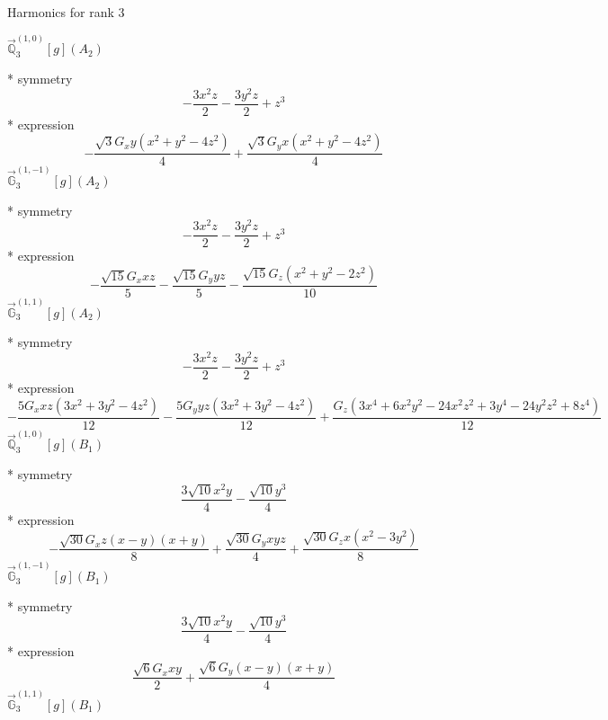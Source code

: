 \documentclass[fleqn,8pt]{jsarticle}
\begin{document}
\noindent * Harmonics for rank 3

\noindent\quad $\vec{\mathbb{Q}}_{3}^{(1,0)}[g](A_{2})$

\noindent\quad ** symmetry
\begin{dmath*}
- \frac{3 x^{2} z}{2} - \frac{3 y^{2} z}{2} + z^{3}
\end{dmath*}
\noindent\quad ** expression
\begin{dmath*}
- \frac{\sqrt{3} G_{x} y \left(x^{2} + y^{2} - 4 z^{2}\right)}{4} + \frac{\sqrt{3} G_{y} x \left(x^{2} + y^{2} - 4 z^{2}\right)}{4}
\end{dmath*}
\noindent\quad $\vec{\mathbb{G}}_{3}^{(1,-1)}[g](A_{2})$

\noindent\quad ** symmetry
\begin{dmath*}
- \frac{3 x^{2} z}{2} - \frac{3 y^{2} z}{2} + z^{3}
\end{dmath*}
\noindent\quad ** expression
\begin{dmath*}
- \frac{\sqrt{15} G_{x} x z}{5} - \frac{\sqrt{15} G_{y} y z}{5} - \frac{\sqrt{15} G_{z} \left(x^{2} + y^{2} - 2 z^{2}\right)}{10}
\end{dmath*}
\noindent\quad $\vec{\mathbb{G}}_{3}^{(1,1)}[g](A_{2})$

\noindent\quad ** symmetry
\begin{dmath*}
- \frac{3 x^{2} z}{2} - \frac{3 y^{2} z}{2} + z^{3}
\end{dmath*}
\noindent\quad ** expression
\begin{dmath*}
- \frac{5 G_{x} x z \left(3 x^{2} + 3 y^{2} - 4 z^{2}\right)}{12} - \frac{5 G_{y} y z \left(3 x^{2} + 3 y^{2} - 4 z^{2}\right)}{12} + \frac{G_{z} \left(3 x^{4} + 6 x^{2} y^{2} - 24 x^{2} z^{2} + 3 y^{4} - 24 y^{2} z^{2} + 8 z^{4}\right)}{12}
\end{dmath*}
\noindent\quad $\vec{\mathbb{Q}}_{3}^{(1,0)}[g](B_{1})$

\noindent\quad ** symmetry
\begin{dmath*}
\frac{3 \sqrt{10} x^{2} y}{4} - \frac{\sqrt{10} y^{3}}{4}
\end{dmath*}
\noindent\quad ** expression
\begin{dmath*}
- \frac{\sqrt{30} G_{x} z \left(x - y\right) \left(x + y\right)}{8} + \frac{\sqrt{30} G_{y} x y z}{4} + \frac{\sqrt{30} G_{z} x \left(x^{2} - 3 y^{2}\right)}{8}
\end{dmath*}
\noindent\quad $\vec{\mathbb{G}}_{3}^{(1,-1)}[g](B_{1})$

\noindent\quad ** symmetry
\begin{dmath*}
\frac{3 \sqrt{10} x^{2} y}{4} - \frac{\sqrt{10} y^{3}}{4}
\end{dmath*}
\noindent\quad ** expression
\begin{dmath*}
\frac{\sqrt{6} G_{x} x y}{2} + \frac{\sqrt{6} G_{y} \left(x - y\right) \left(x + y\right)}{4}
\end{dmath*}
\noindent\quad $\vec{\mathbb{G}}_{3}^{(1,1)}[g](B_{1})$
\end{document}
